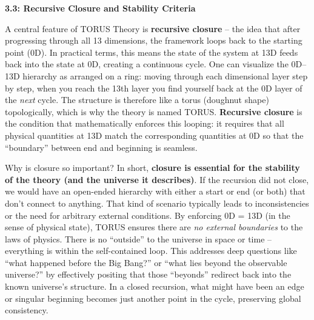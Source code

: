 \documentclass[]{article}
\begin{document}
{\textbf{3.3: Recursive Closure and Stability Criteria}

A central feature of TORUS Theory is \textbf{recursive closure} -- the
idea that after progressing through all 13 dimensions, the framework
loops back to the starting point (0D). In practical terms, this means
the state of the system at 13D feeds back into the state at 0D, creating
a continuous cycle. One can visualize the 0D--13D hierarchy as arranged
on a ring: moving through each dimensional layer step by step, when you
reach the 13th layer you find yourself back at the 0D layer of the
\emph{next} cycle. The structure is therefore like a torus (doughnut
shape) topologically, which is why the theory is named TORUS.
\textbf{Recursive closure} is the condition that mathematically enforces
this looping: it requires that all physical quantities at 13D match the
corresponding quantities at 0D so that the ``boundary'' between end and
beginning is seamless​.

Why is closure so important? In short, \textbf{closure is essential for
the stability of the theory (and the universe it describes)}. If the
recursion did not close, we would have an open-ended hierarchy with
either a start or end (or both) that don't connect to anything. That
kind of scenario typically leads to inconsistencies or the need for
arbitrary external conditions. By enforcing 0D = 13D (in the sense of
physical state), TORUS ensures there are \emph{no external boundaries}
to the laws of physics. There is no ``outside'' to the universe in space
or time -- everything is within the self-contained loop. This addresses
deep questions like ``what happened before the Big Bang?'' or ``what
lies beyond the observable universe?'' by effectively positing that
those ``beyonds'' redirect back into the known universe's structure​. In
a closed recursion, what might have been an edge or singular beginning
becomes just another point in the cycle, preserving global consistency.

}
\end{document}
